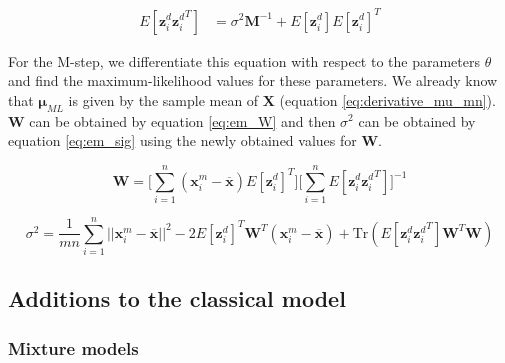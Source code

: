  \begin{equation}
     \begin{split}
         E[\textbf{z}^d_i{\textbf{z}^d_i}^T] &= \sigma^2 \textbf{M}^{-1} + E[\textbf{z}^d_i]E[\textbf{z}^d_i]^T
     \end{split}
 \end{equation}
 
 
 
 For the M-step, we differentiate this equation with respect to the parameters $\theta$ and find the maximum-likelihood values for these parameters. We already know that $\bm{\mu}_{ML}$ is given by the sample mean of $\textbf{X}$ (equation \ref{eq:derivative_mu_mn}). $\textbf{W}$ can be obtained by equation \ref{eq:em_W} and then $\sigma^2$ can be obtained by equation \ref{eq:em_sig} using the newly obtained values for $\textbf{W}$.
 
 \begin{equation}\label{eq:em_W}
     \textbf{W} = \Bigg[\sum^n_{i=1} (\textbf{x}^m_i-\overline{\textbf{x}}) E[\textbf{z}^d_i]^T\Bigg] \Bigg[\sum^n_{i=1} E[\textbf{z}^d_i{\textbf{z}^d_i}^T]\Bigg]^{-1}
 \end{equation}
 
 \begin{equation}\label{eq:em_sig}
     \sigma^2 = \frac{1}{mn} \sum^n_{i=1} ||\textbf{x}^m_i-\overline{\textbf{x}}||^2 - 2E[\textbf{z}_i^d]^T\textbf{W}^T(\textbf{x}^m_i-\overline{\textbf{x}}) + \text{Tr}(E[\textbf{z}^d_i{\textbf{z}^d_i}^T]\textbf{W}^T\textbf{W})
 \end{equation}
 
 
\subsection{Additions to the classical model}
\subsubsection{Mixture models}


